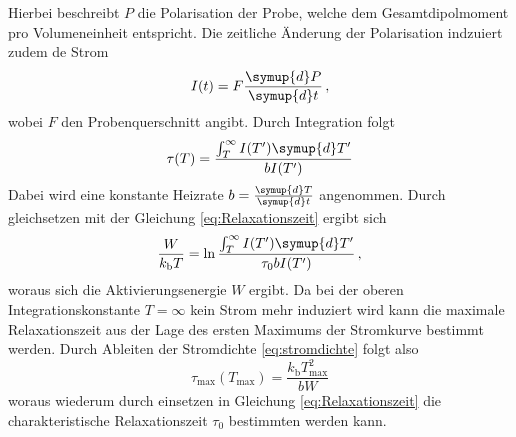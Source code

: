 Hierbei beschreibt $P$ die Polarisation der Probe, welche dem Gesamtdipolmoment pro Volumeneinheit entspricht.
Die zeitliche Änderung der Polarisation indzuiert zudem de Strom
\begin{equation}
    I(t) = F\frac{\symup{d}P}{\symup{d}t} \, ,
\end{equation}
wobei $F$ den Probenquerschnitt angibt.
Durch Integration folgt 
\begin{equation}
    \tau(T) = \frac{ \int_{T}^{\infty} I(T')\symup{d}T'}{bI(T')}
\end{equation}
Dabei wird eine konstante Heizrate $b = \frac{\symup{d}T}{\symup{d}t}$ angenommen.
Durch gleichsetzen mit der Gleichung \eqref{eq:Relaxationszeit} ergibt sich
\begin{equation}
    \frac{W}{k_\text{b}T} = \ln \frac{ \int_{T}^{\infty} I(T')\symup{d}T'}{\tau_0 b I(T')} \, ,
    \label{eq:int}
\end{equation}
woraus sich die Aktivierungsenergie $W$ ergibt.
Da bei der oberen Integrationskonstante $T=\infty$ kein Strom mehr induziert wird kann die maximale Relaxationszeit aus der Lage des ersten Maximums der Stromkurve bestimmt werden.
Durch Ableiten der Stromdichte \eqref{eq:stromdichte} folgt also
\begin{equation}
    \tau _\text{max}(T_\text{max}) = \frac{k_\text{b} T_\text{max} ^2}{bW}
    \label{eq:t_max}
\end{equation}
woraus wiederum durch einsetzen in Gleichung \eqref{eq:Relaxationszeit} die charakteristische Relaxationszeit $\tau_0$ bestimmten werden kann.


